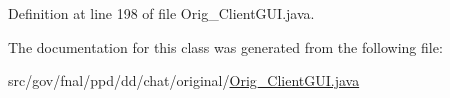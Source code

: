 Definition at line 198 of file Orig\-\_\-\-Client\-G\-U\-I.\-java.



The documentation for this class was generated from the following file\-:\begin{DoxyCompactItemize}
\item 
src/gov/fnal/ppd/dd/chat/original/\hyperlink{Orig__ClientGUI_8java}{Orig\-\_\-\-Client\-G\-U\-I.\-java}\end{DoxyCompactItemize}
